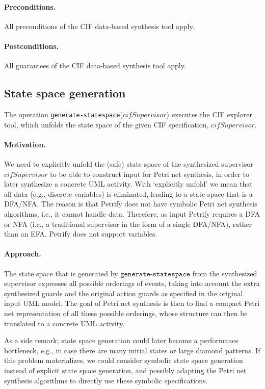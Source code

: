 \documentclass{article}
\newcommand{\keyw}[1]{\texttt{#1}}
\newcommand{\var}[1]{\ensuremath{\mathit{#1}}}
\newcommand{\generateStatespaceLabel}[0]{\keyw{generate-statespace}}
\newcommand{\generateStatespace}[1]{\generateStatespaceLabel(\ensuremath{#1})}
\theoremstyle{definition}
\begin{document}
\paragraph{Preconditions.}
All preconditions of the CIF data-based synthesis tool apply.

\paragraph{Postconditions.}
All guarantees of the CIF data-based synthesis tool apply.

\subsection{State space generation}
\label{sec:state-space-generation}

The operation \generateStatespace{\var{cifSupervisor}} executes the CIF explorer tool, which unfolds the state space of the given CIF specification, \var{cifSupervisor}.

\paragraph{Motivation.}
We need to explicitly unfold the (safe) state space of the synthesized supervisor \var{cifSupervisor} to be able to construct input for Petri net synthesis, in order to later synthesize a concrete UML activity.
With `explicitly unfold' we mean that all data (e.g., discrete variables) is eliminated, leading to a state space that is a DFA/NFA.
The reason is that Petrify does not have symbolic Petri net synthesis algorithms, i.e., it cannot handle data.
Therefore, as input Petrify requires a DFA or NFA (i.e., a traditional supervisor in the form of a single DFA/NFA), rather than an EFA.
Petrify does not support variables.

\paragraph{Approach.}
The state space that is generated by $\generateStatespaceLabel$ from the synthesized supervisor expresses all possible orderings of events, taking into account the extra synthesized guards and the original action guards as specified in the original input UML model.
The goal of Petri net synthesis is then to find a compact Petri net representation of all these possible orderings, whose structure can then be translated to a concrete UML activity.

As a side remark; state space generation could later become a performance bottleneck, e.g., in case there are many initial states or large diamond patterns.
If this problem materializes, we could consider symbolic state space generation instead of explicit state space generation, and possibly adapting the Petri net synthesis algorithms to directly use these symbolic specifications.
\end{document}
